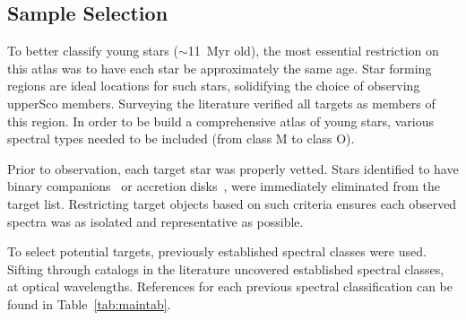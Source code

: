\subsection{Sample Selection}


To better classify young stars ($\sim$11~Myr old), 
the most essential restriction on this atlas was to 
have each star be approximately the same age. 
Star forming regions are ideal locations for such stars, 
solidifying the choice of observing upperSco members.  
Surveying the literature verified all targets as members of this 
region.  In order to be build a comprehensive atlas of young 
stars, various spectral types needed to be included 
(from class M to class O).




Prior to observation, each target star was properly vetted. 
Stars identified to have binary companions~\cite{binary_guy} or accretion 
disks~\cite{binary_guy}, were immediately eliminated from the target list.  
Restricting target objects based on such criteria ensures each observed 
spectra was as isolated and representative as possible.



To select potential targets, previously established spectral classes 
were used.  
Sifting through catalogs in the literature uncovered established 
spectral classes, at optical wavelengths.    
References for each previous spectral classification 
can be found in Table~\ref{tab:maintab}.\\












